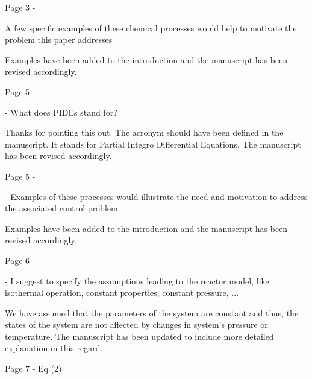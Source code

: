 \documentclass[12pt,answers]{exam}
\begin{document}
\begin{questions}

    \question Page 3 - 

    A few specific examples of these chemical processes would help to motivate the problem this paper addresses

    \begin{solutionorbox}
        Examples have been added to the introduction and the manuscript has been revised accordingly.
    \end{solutionorbox}

    \question Page 5 - 

    - What does PIDEs stand for?

    \begin{solutionorbox}
        Thanks for pointing this out. The acronym should have been defined in the manuscript. It stands for Partial Integro Differential Equations. The manuscript has been revised accordingly.
    \end{solutionorbox}


    \question Page 5 - 

    - Examples of these processes would illustrate the need and motivation to address the associated
    control problem

    \begin{solutionorbox}
        Examples have been added to the introduction and the manuscript has been revised accordingly.
    \end{solutionorbox}


    \question Page 6 - 

    - I suggest to specify the assumptions leading to the reactor model, like isothermal operation,
    constant properties, constant pressure, ...

    \begin{solutionorbox}
        We have assumed that the parameters of the system are constant and thus, the states of the system are not affected by changes in system's pressure or temperature. The manuscript has been updated to include more detailed explanation in this regard.
    \end{solutionorbox}


    \question Page 7 - Eq (2)


\end{questions}
\end{document}

